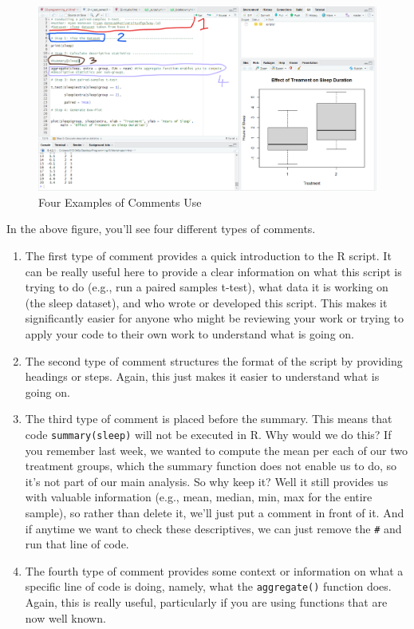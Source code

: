 \documentclass[
]{book}
\begin{document}
\begin{figure}
\centering
\includegraphics{img/03-comments.png}
\caption{\label{fig:unnamed-chunk-11}Four Examples of Comments Use}
\end{figure}

In the above figure, you'll see four different types of comments.

\begin{enumerate}
\def\labelenumi{\arabic{enumi}.}
\item
  The first type of comment provides a quick introduction to the R script. It can be really useful here to provide a clear information on what this script is trying to do (e.g., run a paired samples t-test), what data it is working on (the sleep dataset), and who wrote or developed this script. This makes it significantly easier for anyone who might be reviewing your work or trying to apply your code to their own work to understand what is going on.
\item
  The second type of comment structures the format of the script by providing headings or steps. Again, this just makes it easier to understand what is going on.
\item
  The third type of comment is placed before the summary. This means that code \texttt{summary(sleep)} will not be executed in R. Why would we do this? If you remember last week, we wanted to compute the mean per each of our two treatment groups, which the summary function does not enable us to do, so it's not part of our main analysis. So why keep it? Well it still provides us with valuable information (e.g., mean, median, min, max for the entire sample), so rather than delete it, we'll just put a comment in front of it. And if anytime we want to check these descriptives, we can just remove the \texttt{\#} and run that line of code.
\item
  The fourth type of comment provides some context or information on what a specific line of code is doing, namely, what the \texttt{aggregate()} function does. Again, this is really useful, particularly if you are using functions that are now well known.
\end{enumerate}
\end{document}
